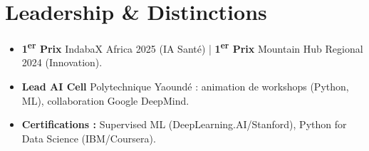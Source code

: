 \documentclass[a4paper,11pt]{article}
\begin{document}
\section{Leadership \& Distinctions}
\begin{itemize}[leftmargin=*, label=\tiny$\bullet$, nosep]
    \item \small{\textbf{1\textsuperscript{er} Prix} IndabaX Africa 2025 (IA Santé) | \textbf{1\textsuperscript{er} Prix} Mountain Hub Regional 2024 (Innovation).}
    \item \small{\textbf{Lead AI Cell} Polytechnique Yaoundé : animation de workshops (Python, ML), collaboration Google DeepMind.}
    \item \small{\textbf{Certifications :} Supervised ML (DeepLearning.AI/Stanford), Python for Data Science (IBM/Coursera).}
\end{itemize}
\end{document}
